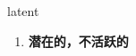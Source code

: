 
\begin{frame}
{\huge latent}
\begin{center}
\begin{enumerate}\Large
  \item \textbf{潜在的，不活跃的}
\end{enumerate}
\end{center}
\end{frame}
